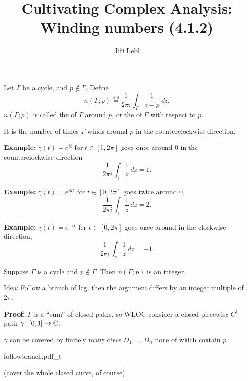 \documentclass[10pt,aspectratio=169]{beamer}
\author{Ji\v{r}\'i Lebl}
\institute[OSU]{%
Departemento pri Matematiko de Oklahoma {\^S}tata Universitato}
\title{Cultivating Complex Analysis:\\%
Winding numbers (4.1.2)}
\date{}
\begin{document}
\begin{frame}
\titlepage
\end{frame}

\begin{frame}
Let $\Gamma$ be
a cycle,
and $p \notin \Gamma$.  Define
\begin{equation*}
n(\Gamma;p)
\overset{\text{def}}{=}
\frac{1}{2\pi i} \int_\Gamma \frac{1}{z-p} \, dz .
\end{equation*}
\pause
$n(\Gamma;p)$ is called the
\emph{} of $\Gamma$ around $p$, or
the 
\emph{} of $\Gamma$ with respect to $p$.

\medskip
\pause

It is the number of times $\Gamma$ winds around $p$ in the counterclockwise
direction.

\medskip
\pause

\textbf{Example:} $\gamma(t) = e^{it}$ for $t \in [0,2\pi]$ goes once around
$0$ in the counterclockwise direction,
\[
\frac{1}{2\pi i} \int_\gamma \frac{1}{z} \, dz = 1.
\]

\pause
\textbf{Example:} $\gamma(t) = e^{i2t}$ for $t \in [0,2\pi]$ goes twice around
$0$,
\[
\frac{1}{2\pi i} \int_\gamma \frac{1}{z} \, dz = 2.
\]

\pause
\textbf{Example:} $\gamma(t) = e^{-it}$ for $t \in [0,2\pi]$ goes once
around in the clockwise direction,
\[
\frac{1}{2\pi i} \int_\gamma \frac{1}{z} \, dz = -1.
\]
\end{frame}

\begin{frame}
\begin{proposition}
Suppose $\Gamma$ is a cycle and $p \notin \Gamma$.  Then
$n(\Gamma;p)$ is an integer.
\end{proposition}

\pause

Idea: Follow a branch of log, then the argument differs
by an integer multiple of $2\pi$.



\medskip
\pause
\textbf{Proof:}
$\Gamma$ is a ``sum'' of closed paths, so WLOG consider a closed
piecewise-$C^1$ path
$\gamma \colon [0,1] \to {\mathbb{C}}$.

\medskip
\pause

$\gamma$ can be covered by finitely many discs $D_1,\ldots,D_n$
none of which contain $p$.

\medskip
\begin{center}
{followbranch.pdf_t}
\end{center}

\pause
(cover the whole closed curve, of course)

\end{frame}
\end{document}
